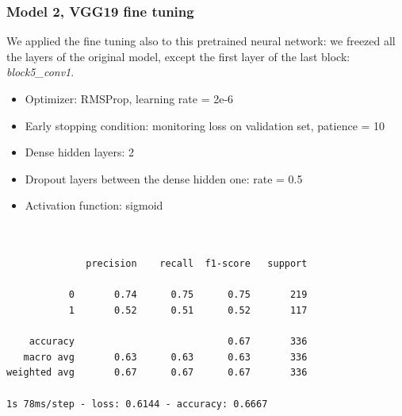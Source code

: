 \documentclass{article}
\begin{document}
\subsubsection{Model 2, VGG19 fine tuning}
We applied the fine tuning also to this pretrained neural network: we freezed all the layers of the original model, except the first layer of the last block: \textit{block5\_conv1}.

\begin{itemize}
\item Optimizer: RMSProp, learning rate = 2e-6
\item Early stopping condition: monitoring loss on validation set, patience = 10
\item Dense hidden layers: 2
\item Dropout layers between the dense hidden one: rate = 0.5
\item Activation function: sigmoid
\end{itemize}

\begin{verbatim}


              precision    recall  f1-score   support

           0       0.74      0.75      0.75       219
           1       0.52      0.51      0.52       117

    accuracy                           0.67       336
   macro avg       0.63      0.63      0.63       336
weighted avg       0.67      0.67      0.67       336

1s 78ms/step - loss: 0.6144 - accuracy: 0.6667

\end{verbatim}
\end{document}
